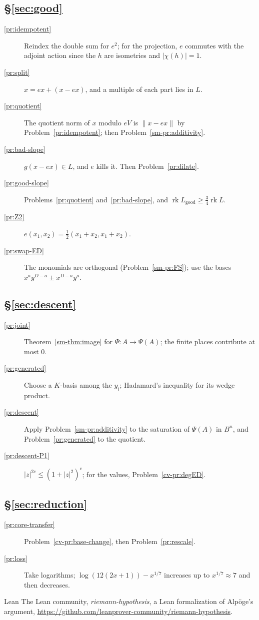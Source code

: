 \documentclass[reqno]{amsart}
\theoremstyle{definition}
\theoremstyle{plain}
\theoremstyle{remark}
\newcommand{\rk}{\operatorname{rk}}
\newcommand{\Lg}{L_{\mathrm{good}}}
\begin{document}
\subsection*{\S\ref{sec:good}}
\begin{description}
\item[\ref{pr:idempotent}] Reindex the double sum for \(e^2\); for the projection, \(e\) commutes with the adjoint action since the \(h\) are isometries and \(\lvert\chi(h)\rvert = 1\).
\item[\ref{pr:split}] \(x = ex + (x - ex)\), and a multiple of each part lies in \(L\).
\item[\ref{pr:quotient}] The quotient norm of \(x\) modulo \(eV\) is \(\lVert x - ex\rVert\) by Problem~\ref{pr:idempotent}; then Problem~\ref{sm-pr:additivity}.
\item[\ref{pr:bad-slope}] \(g(x - ex) \in L\), and \(e\) kills it.  Then Problem~\ref{pr:dilate}.
\item[\ref{pr:good-slope}] Problems~\ref{pr:quotient} and~\ref{pr:bad-slope}, and \(\rk\Lg \ge \frac34\rk L\).
\item[\ref{pr:Z2}] \(e(x_1, x_2) = \frac12(x_1 + x_2, x_1 + x_2)\).
\item[\ref{pr:swap-ED}] The monomials are orthogonal (Problem~\ref{sm-pr:FS}); use the bases \(x^ay^{D-a} \pm x^{D-a}y^a\).
\end{description}

\subsection*{\S\ref{sec:descent}}
\begin{description}
\item[\ref{pr:joint}] Theorem~\ref{sm-thm:image} for \(\Psi \colon A \to \Psi(A)\); the finite places contribute at most \(0\).
\item[\ref{pr:generated}] Choose a \(K\)-basis among the \(y_i\); Hadamard's inequality for its wedge product.
\item[\ref{pr:descent}] Apply Problem~\ref{sm-pr:additivity} to the saturation of \(\Psi(A)\) in \(B^n\), and Problem~\ref{pr:generated} to the quotient.
\item[\ref{pr:descent-P1}] \(\lvert z\rvert^{2c} \le (1 + \lvert z\rvert^2)^c\); for the values, Problem~\ref{cv-pr:degED}.
\end{description}

\subsection*{\S\ref{sec:reduction}}
\begin{description}
\item[\ref{pr:core-transfer}] Problem~\ref{cv-pr:base-change}, then Problem~\ref{pr:rescale}.
\item[\ref{pr:loss}] Take logarithms; \(\log(12(2x+1)) - x^{1/7}\) increases up to \(x^{1/7} \approx 7\) and then decreases.
\end{description}

\begin{thebibliography}{Lean}
 The Lean community, \emph{riemann-hypothesis}, a Lean formalization of Alp\"oge's argument, \url{https://github.com/leanprover-community/riemann-hypothesis}.
\end{thebibliography}
\end{document}
